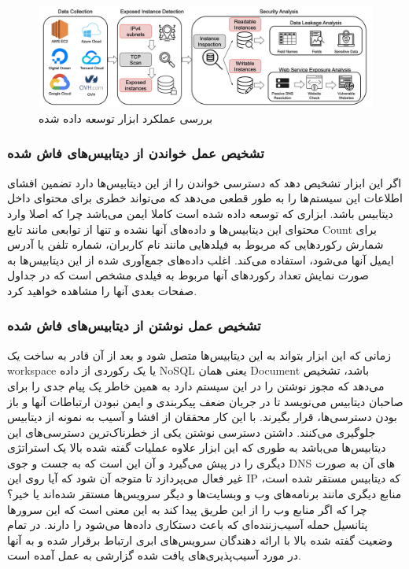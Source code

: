 \documentclass[10pt, a4paper]{article}
\begin{document}
\begin{figure}
    \centering
    \includegraphics[width=1\textwidth]{res/fig1.png}
    \caption{بررسی عملکرد ابزار توسعه داده شده}
    \label{fig: diagram}
\end{figure}

\subsubsection{تشخیص عمل خواندن از دیتابیس‌های فاش شده}

اگر این ابزار تشخیص دهد که دسترسی خواندن را از این دیتابیس‌ها دارد تضمین افشای
اطلاعات این سیستم‌ها را به طور قطعی می‌دهد که می‌تواند خطری برای محتوای داخل
دیتابیس باشد. ابزاری که توسعه داده شده است کاملا ایمن می‌باشد چرا که اصلا وارد
محتوای این دیتابیس‌ها و داده‌های آنها نشده و تنها از توابعی مانند تابع Count
برای شمارش رکورد‌هایی که مربوط به فیلد‌هایی مانند نام کاربران، شماره تلفن یا
آدرس ایمیل آنها می‌شود، استفاده می‌کند. اغلب داده‌های جمع‌آوری شده از این
دیتابیس‌ها به صورت نمایش تعداد رکورد‌های آنها مربوط به فیلدی مشخص است که در
جداول صفحات بعدی آنها را مشاهده خواهید کرد.

\subsubsection{تشخیص عمل نوشتن از دیتابیس‌های فاش شده}

زمانی که این ابزار بتواند به این دیتابیس‌ها متصل شود و بعد از آن قادر به ساخت یک
workspace یا یک رکوردی از داده‌ NoSQL یعنی همان Document باشد، تشخیص می‌دهد که
مجوز نوشتن را در این سیستم دارد به همین خاطر یک پیام جدی را برای صاحبان دیتابیس
می‌نویسد تا در جریان ضعف پیکربندی و ایمن نبودن ارتباطات آنها و باز بودن
دسترسی‌ها، قرار بگیرند. با این کار محققان از افشا و آسیب به نمونه از دیتابیس
جلوگیری می‌کنند. داشتن دسترسی نوشتن یکی از خطرناک‌ترین دسترسی‌های این دیتابیس‌ها
می‌باشد به طوری که این ابزار علاوه عملیات گفته شده بالا یک استراتژی دیگری را در
پیش می‌گیرد و آن این است که به جست و جوی DNS های آن به صورت غیر فعال می‌پردازد
تا متوجه آن شود که آیا روی این IP که دیتابیس مستقر شده است، منابع دیگری مانند
برنامه‌های وب و وبسایت‌ها و دیگر سرویس‌ها مستقر شده‌اند یا خیر؟ چرا که اگر منابع
وب را از این طریق پیدا کند به این معنی است که این سرور‌ها پتانسیل حمله
آسیب‌زننده‌ای که باعث دستکاری داده‌ها می‌شود را دارند. در تمام وضعیت گفته شده
بالا با ارائه دهندگان سرویس‌های ابری ارتباط برقرار شده و به آنها در مورد
آسیب‌پذیری‌های یافت شده گزارشی به عمل آمده است.
\end{document}

